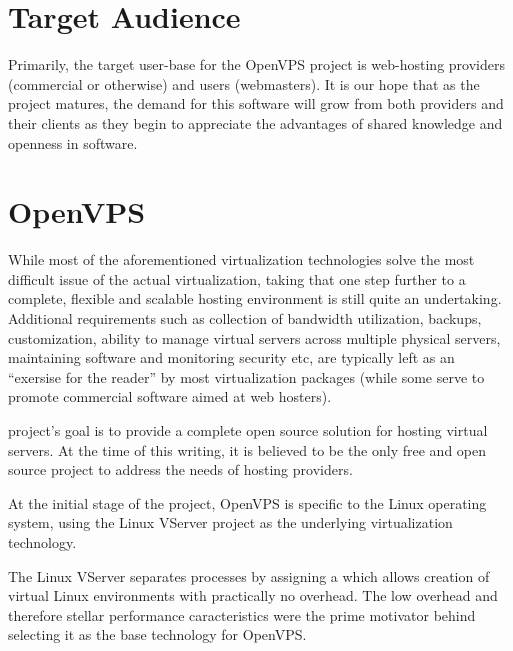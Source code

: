 \begin{seealso}
\end{seealso}

\section{Target Audience\label{intr-target}}

Primarily, the target user-base for the OpenVPS project is web-hosting
providers (commercial or otherwise) and users (webmasters). It is our
hope that as the project matures, the demand for this software will
grow from both providers and their clients as they begin to appreciate
the advantages of shared knowledge and openness in software.

\section{OpenVPS\label{intr-openvps}}

While most of the aforementioned virtualization technologies solve the
most difficult issue of the actual virtualization, taking that one
step further to a complete, flexible and scalable hosting environment
is still quite an undertaking. Additional requirements such as
collection of bandwidth utilization, backups, customization, ability
to manage virtual servers across multiple physical servers,
maintaining software and monitoring security etc, are typically left
as an ``exersise for the reader'' by most virtualization packages
(while some serve to promote commercial software aimed at web
hosters).

 project's goal is to provide a complete open source
solution for hosting virtual servers. At the time of this writing, it
is believed to be the only free and open source project to address the
needs of hosting providers.

At the initial stage of the project, OpenVPS is specific to the Linux
operating system, using the Linux VServer project as the underlying
virtualization technology. 

The Linux VServer separates processes by assigning a 
which allows creation of virtual Linux environments with practically
no overhead. The low overhead and therefore stellar performance
caracteristics were the prime motivator behind selecting it as the
base technology for OpenVPS.

